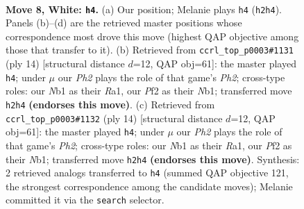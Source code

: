 \documentclass[11pt]{article}
\begin{document}
\begin{figure}[p]\centering
\begin{subfigure}{0.46\textwidth}\centering
\resizebox{\linewidth}{!}{%
\newchessgame
\chessboard[
  setfen={r1b1kbnr/p1ppqppp/2p5/4P3/8/8/PPP1QPPP/RNB1KB1R w KQkq - 3 8},
  showmover=false,
  pgfstyle=straightmove, color=movearrow, markmove={h2-h4}
]}
\caption{}
\end{subfigure}\hfill
\begin{subfigure}{0.46\textwidth}\centering
\resizebox{\linewidth}{!}{%
\newchessgame
\chessboard[
  setfen={r1b1kb1r/p1ppqppp/2p5/3nP3/8/8/PPP1QPPP/RNB1KB1R w KQkq - 3 8},
  showmover=false,
  pgfstyle=straightmove, color=movearrow, markmove={h2-h4}
]}
\caption{}
\end{subfigure}
\\[4pt]
\begin{subfigure}{0.46\textwidth}\centering
\resizebox{\linewidth}{!}{%
\newchessgame
\chessboard[
  setfen={r1b1kb1r/p1ppqppp/2p5/3nP3/8/8/PPP1QPPP/RNB1KB1R w KQkq - 3 8},
  showmover=false,
  pgfstyle=straightmove, color=movearrow, markmove={h2-h4}
]}
\caption{}
\end{subfigure}\hfill

\caption{\textbf{Move 8, White: \texttt{h4}.} (a) Our position; Melanie plays \texttt{h4} (\texttt{h2h4}). Panels (b)--(d) are the retrieved master positions whose correspondence most drove this move (highest QAP objective among those that transfer to it). (b) Retrieved from \texttt{ccrl\_top\_p0003\#1131} (ply 14) [structural distance $d$=12, QAP obj=61]: the master played \texttt{h4}; under $\mu$ our \emph{Ph2} plays the role of that game's \emph{Ph2}; cross-type roles: our \emph{N}b1 as their \emph{R}a1, our \emph{P}f2 as their \emph{N}b1; transferred move \texttt{h2h4} \textbf{(endorses this move)}. (c) Retrieved from \texttt{ccrl\_top\_p0003\#1132} (ply 14) [structural distance $d$=12, QAP obj=61]: the master played \texttt{h4}; under $\mu$ our \emph{Ph2} plays the role of that game's \emph{Ph2}; cross-type roles: our \emph{N}b1 as their \emph{R}a1, our \emph{P}f2 as their \emph{N}b1; transferred move \texttt{h2h4} \textbf{(endorses this move)}. Synthesis: 2 retrieved analogs transferred to \texttt{h4} (summed QAP objective 121, the strongest correspondence among the candidate moves); Melanie committed it via the \texttt{search} selector.}
\label{fig:thought-m14}
\end{figure}

\clearpage
\end{document}
